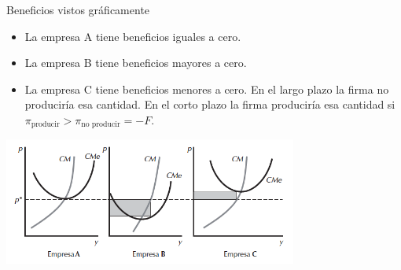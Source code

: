 \documentclass{beamer}
\theoremstyle{definition}
\begin{document}
\begin{frame}{Beneficios vistos gráficamente}
    \begin{itemize}
        \item La empresa A tiene beneficios iguales a cero.
        \item La empresa B tiene beneficios mayores a cero.
        \item La empresa C tiene beneficios menores a cero. En el largo plazo la firma no produciría esa cantidad. En el corto plazo la firma produciría esa cantidad si $\pi_{\text{producir}}>\pi_{\text{no producir}}=-F$.
    \end{itemize}
\begin{center}
\includegraphics[width=3.8in]{figures5/industry_profits.png}
\end{center}
\end{frame}
\end{document}

